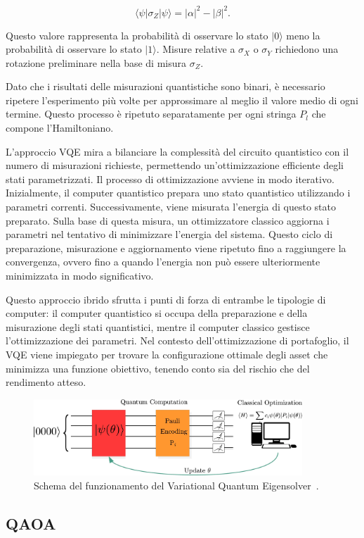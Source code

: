 \begin{equation}
    \langle \psi | \sigma_Z | \psi \rangle = |\alpha|^2 - |\beta|^2.
\end{equation}

Questo valore rappresenta la probabilità di osservare lo stato \(|0\rangle\) meno 
la probabilità di osservare lo stato \(|1\rangle\). Misure relative a \(\sigma_X\) 
o \(\sigma_Y\) richiedono una rotazione preliminare nella base di misura \(\sigma_Z\).

Dato che i risultati delle misurazioni quantistiche sono binari, è necessario 
ripetere l'esperimento più volte per approssimare al meglio il valore medio 
di ogni termine. Questo processo è ripetuto separatamente per ogni stringa 
\(P_l\) che compone l'Hamiltoniano.

L'approccio VQE mira a bilanciare la complessità del circuito quantistico con il 
numero di misurazioni richieste, permettendo un'ottimizzazione efficiente degli 
stati parametrizzati. Il processo di ottimizzazione avviene in modo iterativo. 
Inizialmente, il computer quantistico prepara uno stato quantistico utilizzando 
i parametri correnti. Successivamente, viene misurata l'energia di questo stato 
preparato. Sulla base di questa misura, un ottimizzatore classico aggiorna i 
parametri nel tentativo di minimizzare l'energia del sistema. Questo ciclo di 
preparazione, misurazione e aggiornamento viene ripetuto fino a raggiungere la 
convergenza, ovvero fino a quando l'energia non può essere ulteriormente 
minimizzata in modo significativo.

Questo approccio ibrido sfrutta i punti di forza di entrambe le tipologie di 
computer: il computer quantistico si occupa della preparazione e della misurazione 
degli stati quantistici, mentre il computer classico gestisce l'ottimizzazione 
dei parametri. Nel contesto dell'ottimizzazione di portafoglio, il VQE viene 
impiegato per trovare la configurazione ottimale degli asset che minimizza una 
funzione obiettivo, tenendo conto sia del rischio che del rendimento atteso.

\begin{figure}[h!]
    \centering
    \includegraphics[width=0.9\textwidth]{images/vqe.png}
    \caption{Schema del funzionamento del Variational Quantum Eigensolver~\cite{buonaiuto2023best}.}
\end{figure}


\subsection{QAOA}\label{sec:qaoa}
